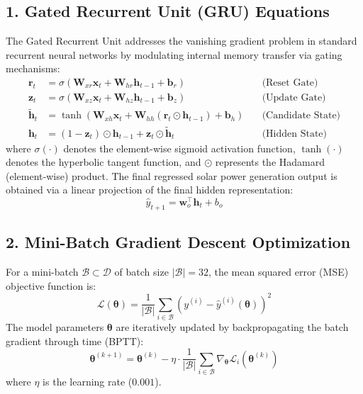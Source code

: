 \documentclass[12pt,a4paper]{article}
\begin{document}
\subsection*{1. Gated Recurrent Unit (GRU) Equations}
The Gated Recurrent Unit addresses the vanishing gradient problem in standard recurrent neural networks by modulating internal memory transfer via gating mechanisms:
\begin{align}
    \mathbf{r}_t &= \sigma(\mathbf{W}_{xr} \mathbf{x}_t + \mathbf{W}_{hr} \mathbf{h}_{t-1} + \mathbf{b}_r) \quad &\text{(Reset Gate)} \\
    \mathbf{z}_t &= \sigma(\mathbf{W}_{xz} \mathbf{x}_t + \mathbf{W}_{hz} \mathbf{h}_{t-1} + \mathbf{b}_z) \quad &\text{(Update Gate)} \\
    \mathbf{\tilde{h}}_t &= \tanh(\mathbf{W}_{xh} \mathbf{x}_t + \mathbf{W}_{hh} (\mathbf{r}_t \odot \mathbf{h}_{t-1}) + \mathbf{b}_h) \quad &\text{(Candidate State)} \\
    \mathbf{h}_t &= (1 - \mathbf{z}_t) \odot \mathbf{h}_{t-1} + \mathbf{z}_t \odot \mathbf{\tilde{h}}_t \quad &\text{(Hidden State)}
\end{align}
where $\sigma(\cdot)$ denotes the element-wise sigmoid activation function, $\tanh(\cdot)$ denotes the hyperbolic tangent function, and $\odot$ represents the Hadamard (element-wise) product.
The final regressed solar power generation output is obtained via a linear projection of the final hidden representation:
\begin{equation}
    \hat{y}_{t+1} = \mathbf{w}_o^\top \mathbf{h}_t + b_o
\end{equation}

\subsection*{2. Mini-Batch Gradient Descent Optimization}
For a mini-batch $\mathcal{B} \subset \mathcal{D}$ of batch size $|\mathcal{B}| = 32$, the mean squared error (MSE) objective function is:
\begin{equation}
    \mathcal{L}(\boldsymbol{\theta}) = \frac{1}{|\mathcal{B}|} \sum_{i \in \mathcal{B}} \left( y^{(i)} - \hat{y}^{(i)}(\boldsymbol{\theta}) \right)^2
\end{equation}
The model parameters $\boldsymbol{\theta}$ are iteratively updated by backpropagating the batch gradient through time (BPTT):
\begin{equation}
    \boldsymbol{\theta}^{(k+1)} = \boldsymbol{\theta}^{(k)} - \eta \cdot \frac{1}{|\mathcal{B}|} \sum_{i \in \mathcal{B}} \nabla_{\boldsymbol{\theta}} \mathcal{L}_i(\boldsymbol{\theta}^{(k)})
\end{equation}
where $\eta$ is the learning rate ($0.001$).
\end{document}
